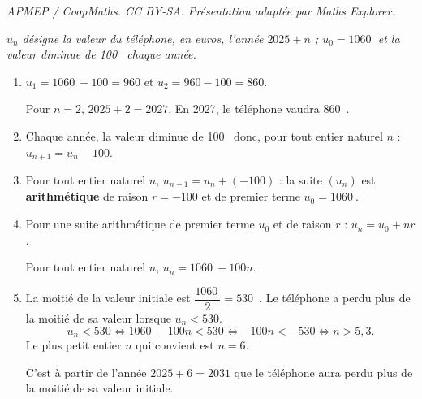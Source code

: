 \documentclass[10pt]{article}
\providecommand{\euro}{\texteuro}
\providecommand{\np}[2][]{{#2~#1}}
\providecommand{\euro}{{\text{€}}}
\renewcommand{\euro}{\ifmmode\text{\texteuro}\else\texteuro\fi}
\begin{document}
\noindent\textit{APMEP / CoopMaths. CC BY-SA. Présentation adaptée par Maths Explorer.}\par\medskip
\emph{$u_n$ désigne la valeur du téléphone, en euros, l'année $2025 + n$ ; $u_0 = \np{1060}$ et la
valeur diminue de 100~\euro{} chaque année.}

\begin{enumerate}
	\item $u_1 = \np{1060} - 100 = 960$ \quad et \quad $u_2 = 960 - 100 = 860$.

	Pour $n = 2$,\: $2025 + 2 = 2027$.
	En 2027, le téléphone vaudra 860~\euro.

	\item Chaque année, la valeur diminue de 100~\euro{} donc, pour tout entier naturel $n$ :
	$u_{n+1} = u_n - 100$.

	\item Pour tout entier naturel $n$, $u_{n+1} = u_n + (-100)$ : la suite $(u_n)$ est
	\textbf{arithmétique} de raison $r = -100$ et de premier terme $u_0 = \np{1060}$.

	\item Pour une suite arithmétique de premier terme $u_0$ et de raison $r$ :
	$u_n = u_0 + nr$.

	Pour tout entier naturel $n$, $u_n = \np{1060} - 100n$.

	\item La moitié de la valeur initiale est $\dfrac{\np{1060}}{2} = 530$~\euro. Le téléphone a perdu plus
	de la moitié de sa valeur lorsque $u_n < 530$.
	\[u_n < 530 \iff \np{1060} - 100n < 530 \iff -100n < -530 \iff n > 5,3.\]
	Le plus petit entier $n$ qui convient est $n = 6$.

	C'est à partir de l'année $2025 + 6 = 2031$ que le téléphone aura perdu plus de
	la moitié de sa valeur initiale.
\end{enumerate}
\end{document}

